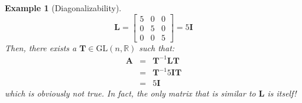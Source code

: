 \documentclass[a4paper,10pt,oneside]{book}
\newtheorem{example}{Example}
\begin{document}
\begin{example}[Diagonalizability]
\begin{equation}
 \mathbf{L}=\left[ {\begin{array}{ccc}
 5 & 0 & 0\\
 0 & 5 & 0\\
 0 & 0 & 5
 \end{array} } \right]=5\mathbf{I}
\end{equation}
Then, there exists a $\mathbf{T}\in\text{GL}(n,\mathbb{R})$ such that:
\begin{eqnarray}
 \mathbf{A}&=&\mathbf{T}^{-1}\mathbf{LT}\\
           &=&\mathbf{T}^{-1}5\mathbf{IT}\\
           &=&5\mathbf{I}
\end{eqnarray}
which is obviously not true. In fact, the only matrix that is similar to $\mathbf{L}$ is itself!
\end{example}
\end{document}

